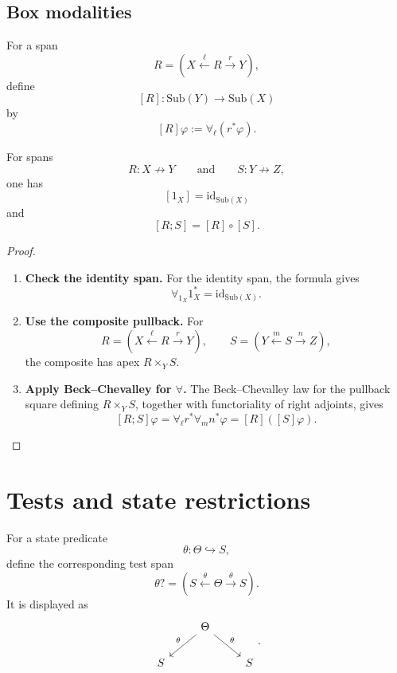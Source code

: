 \subsection{Box modalities}
\label{subsec:relative-box-modalities}

\begin{definition}
\label{def:relative-span-box}
For a span
\[
R=
(X\xleftarrow{\ell}R\xrightarrow{r}Y),
\]
define
\[
[R]:\mathrm{Sub}(Y)\to\mathrm{Sub}(X)
\]
by
\[
[R]\varphi:=\forall_\ell(r^\ast\varphi).
\]
\end{definition}

\begin{proposition}
\label{prop:relative-box-functoriality}
For spans
\[
R:X\nrightarrow Y
\qquad\text{and}\qquad
S:Y\nrightarrow Z,
\]
one has
\[
[1_X]=\mathrm{id}_{\mathrm{Sub}(X)}
\]
and
\[
[R;S]=[R]\circ[S].
\]
\end{proposition}

\begin{proof}
\leavevmode
\begin{enumerate}
\item \textbf{Check the identity span.}
For the identity span, the formula gives
\[
\forall_{1_X}1_X^\ast=\mathrm{id}_{\mathrm{Sub}(X)}.
\]

\item \textbf{Use the composite pullback.}
For
\[
R=(X\xleftarrow{\ell}R\xrightarrow{r}Y),
\qquad
S=(Y\xleftarrow{m}S\xrightarrow{n}Z),
\]
the composite has apex \(R\times_Y S\).

\item \textbf{Apply Beck--Chevalley for \(\forall\).}
The Beck--Chevalley law for the pullback square defining \(R\times_Y S\),
together with functoriality of right adjoints, gives
\[
[R;S]\varphi
=
\forall_\ell r^\ast\forall_m n^\ast\varphi
=
[R]([S]\varphi).
\]
\end{enumerate}
\end{proof}


\section{Tests and state restrictions}
\label{subsec:relative-tests}

\begin{definition}[Tests]
\label{def:relative-tests}
For a state predicate
\[
\theta:\Theta\hookrightarrow S,
\]
define the corresponding test span
\[
\theta?
=
(S\xleftarrow{\theta}\Theta\xrightarrow{\theta}S).
\]
It is displayed as
\[
\begin{tikzcd}
& \Theta \arrow[dl,"\theta"'] \arrow[dr,"\theta"] & \\
S && S
\end{tikzcd}
.
\]
\end{definition}

